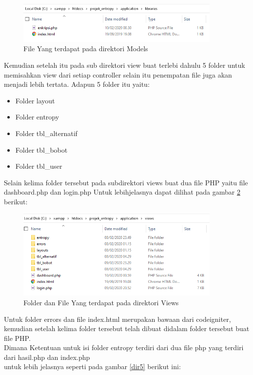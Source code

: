 \begin{figure}[!htbp]
	\centerline{\includegraphics[width=0.90\textwidth]{figures/dir/3.png}}
	\caption{File Yang terdapat pada direktori Models}
	\label{dir3}
\end{figure}
Kemudian setelah itu pada sub direktori view buat terlebi dahulu 5 folder untuk memisahkan view dari setiap controller selain itu penempatan file juga akan menjadi lebih tertata. Adapun 5 folder itu yaitu:
\begin{itemize}
\item	Folder layout
\item	Folder entropy 
\item	Folder tbl\_alternatif
\item	Folder tbl\_bobot
\item	Folder tbl\_user 
\end{itemize}
\pagebreak 
Selain kelima folder tersebut pada subdirektori views buat dua file PHP yaitu file dashboard.php dan login.php
Untuk lebihjelasnya dapat dilihat pada gambar \ref{dir4}  berikut:

\begin{figure}[!htbp]
	\centerline{\includegraphics[width=0.90\textwidth]{figures/dir/4.png}}
	\caption{Folder dan File Yang terdapat pada direktori Views}
	\label{dir4}
\end{figure}

Untuk folder errors dan file index.html merupakan bawaan dari codeigniter, kemudian setelah kelima folder tersebut telah dibuat didalam folder tersebut buat file PHP.\\

Dimana Ketentuan untuk isi folder entropy terdiri dari dua file php yang terdiri dari hasil.php dan index.php\\
untuk lebih jelasnya seperti pada gambar \ref{dir5} berikut ini:

